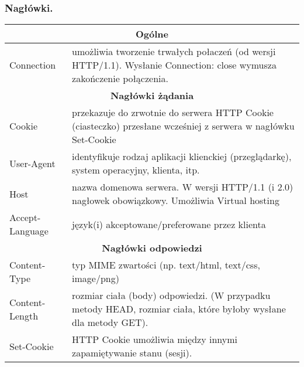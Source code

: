 \documentclass[../main.tex]{subfiles}
\begin{document}
    \subsubsection{Nagłówki.}
    \begin{table}[H]
        \begin{center}
            \begin{tabular}{|p{4cm}|p{8cm}|}
                \hline
                \multicolumn{2}{|c|}{\textbf{Ogólne}}\\
                \hline
                Connection & umożliwia tworzenie trwałych połaczeń (od wersji HTTP/1.1). Wysłanie Connection: close wymusza zakończenie połączenia.\\
                \hline
                \hline
                \multicolumn{2}{|c|}{\textbf{Nagłówki żądania}}\\
                \hline
                Cookie & przekazuje do zrwotnie do serwera HTTP Cookie (ciasteczko) przesłane wcześniej z serwera w nagłówku Set-Cookie\\
                \hline
                User-Agent & identyfikuje rodzaj aplikacji klienckiej (przeglądarkę), system operacyjny, klienta, itp.\\
                \hline
                Host & nazwa domenowa serwera. W wersji HTTP/1.1 (i 2.0) nagłowek obowiązkowy. Umożliwia Virtual hosting\\
                \hline
                Accept-Language & język(i) akceptowane/preferowane przez klienta\\
                \hline
                \hline
                \multicolumn{2}{|c|}{\textbf{Nagłówki odpowiedzi}}\\
                \hline
                Content-Type & typ MIME zwartości (np. text/html, text/css, image/png)\\
                \hline
                Content-Length & rozmiar ciała (body) odpowiedzi. (W przypadku metody HEAD, rozmiar ciała, które byłoby wysłane dla metody GET).\\
                \hline
                Set-Cookie & HTTP Cookie umożliwia między innymi zapamiętywanie stanu (sesji).\\
                \hline
            \end{tabular}
        \end{center}
    \end{table}
\end{document}
